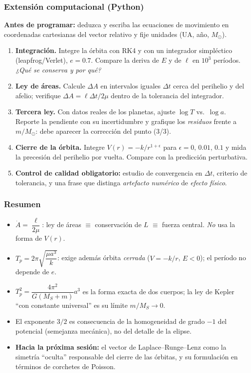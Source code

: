 \documentclass[10pt]{beamer}
\begin{document}
\begin{frame}
\frametitle{Extensión computacional (Python)}
\small
\textbf{Antes de programar:} deduzca y escriba las ecuaciones de movimiento en
coordenadas cartesianas del vector relativo y fije unidades (UA, año, $M_\odot$).
\begin{enumerate}
  \item<1-> \textbf{Integración.} Integre la órbita con RK4 y con un integrador
        simpléctico (leapfrog/Verlet), $e=0.7$. Compare la deriva de $E$ y de
        $\ell$ en $10^{3}$ períodos. \emph{¿Qué se conserva y por qué?}
  \item<2-> \textbf{Ley de áreas.} Calcule $\Delta A$ en intervalos iguales
        $\Delta t$ cerca del perihelio y del afelio; verifique
        $\Delta A=\ell\Delta t/2\mu$ dentro de la tolerancia del integrador.
  \item<3-> \textbf{Tercera ley.} Con datos reales de los planetas, ajuste
        $\log T$ vs.\ $\log a$. Reporte la pendiente con su incertidumbre y
        grafique los \emph{residuos} frente a $m/M_\odot$: debe aparecer la
        corrección del punto (3/3).
  \item<4-> \textbf{Cierre de la órbita.} Integre $V(r)=-k/r^{1+\epsilon}$ para
        $\epsilon=0,\,0.01,\,0.1$ y mida la precesión del perihelio por vuelta.
        Compare con la predicción perturbativa.
  \item<5-> \textbf{Control de calidad obligatorio:} estudio de convergencia en
        $\Delta t$, criterio de tolerancia, y una frase que distinga
        \emph{artefacto numérico} de \emph{efecto físico}.
\end{enumerate}
\end{frame}

\begin{frame}
\frametitle{Resumen}
\begin{itemize}
  \item<1-> $\dot A=\dfrac{\ell}{2\mu}$: ley de áreas $\equiv$ conservación de
        $L$ $\equiv$ fuerza central. \emph{No} usa la forma de $V(r)$.
  \item<2-> $T_p=2\pi\sqrt{\dfrac{\mu a^{3}}{k}}$: exige además órbita
        \emph{cerrada} ($V=-k/r$, $E<0$); el período no depende de $e$.
  \item<3-> $T_p^{2}=\dfrac{4\pi^{2}}{G(M_S+m)}a^{3}$ es la forma exacta de dos
        cuerpos; la ley de Kepler ``con constante universal'' es su límite
        $m/M_S\to0$.
  \item<4-> El exponente $3/2$ es consecuencia de la homogeneidad de grado $-1$
        del potencial (semejanza mecánica), no del detalle de la elipse.
  \item<5-> \textbf{Hacia la próxima sesión:} el vector de Laplace--Runge--Lenz
        como la simetría ``oculta'' responsable del cierre de las órbitas, y su
        formulación en términos de corchetes de Poisson.
\end{itemize}
\end{frame}
\end{document}
